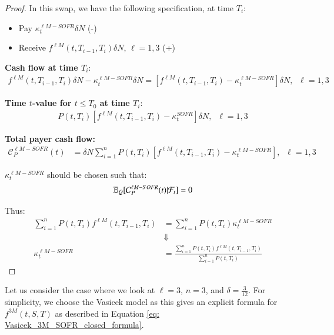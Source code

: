 \begin{proof}
    
In this swap, we have the following specification, at time $T_{i}$:
\begin{itemize}[leftmargin=*]
    \item Pay $\kappa_{t}^{\ell M-SOFR}\delta N$ (-)
    \item Receive $f^{\ell M}(t,T_{i-1}, T_{i})\delta N$, \; $\ell=1,3$ (+)
\end{itemize} 

\textbf{Cash flow at time $T_{i}$}:
\begin{align*}
f^{\ell M}(t, T_{i-1}, T_{i})\delta N - \kappa_{t}^{\ell M-SOFR}\delta N =
[f^{\ell M}(t,T_{i-1}, T_{i}) -\kappa_{t}^{\ell M-SOFR}]\delta N, \;\; \ell =1,3
\end{align*}

\textbf{Time $t$-value for $t\leq T_{0}$ at time $T_{i}$}: 
\begin{align*}
P(t,T_{i})[f^{\ell M}(t,T_{i-1}, T_{i}) - \kappa_{t}^{SOFR}]\delta N,\;\; \ell =1,3
\end{align*}

\textbf{Total payer cash flow:}
\begin{align*}
\mathcal{C}_{P}^{\ell M-SOFR}(t) &= 
\delta N \sum_{i=1}^{n}P(t,T_{i})[f^{\ell M}(t,T_{i-1}, T_{i}) - \kappa_{t}^{\ell M-SOFR}], \;\; \ell =1,3
\end{align*} 

$\kappa_{t}^{\ell M-SOFR}$ should be chosen such that: 
\begin{align*}
\mathbb{E}_{Q}[\mathcal{C}_{P}^{\ell M-SOFR}(t)|\mathcal{F}_{t}] = 0    
\end{align*}

Thus: 
\begin{align*}
\sum_{i=1}^{n}P(t,T_{i})f^{\ell M}(t,T_{i-1}, T_{i}) &= \sum_{i=1}^{n}P(t,T_{i})\kappa_{t}^{\ell M-SOFR} \\ 
&\Downarrow \\ 
\kappa_{t}^{\ell M-SOFR} &= \frac{
\sum_{i=1}^{n}P(t,T_{i})f^{\ell M}(t,T_{i-1}, T_{i})
}{
\sum_{i=1}^{n}P(t,T_{i})
}
\end{align*}
\end{proof}

\newpage 

Let us consider the case where we look at $\ell=3$, $n=3$, and $\delta = \frac{3}{12}$. For simplicity, we choose the Vasicek model as this gives an explicit formula for $f^{3M}(t,S,T)$ as described in Equation \ref{eq: Vasicek_3M_SOFR_closed_formula}.


